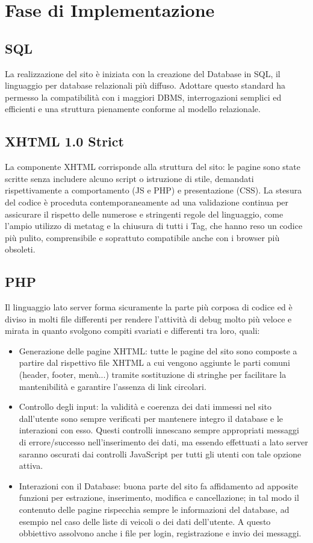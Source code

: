 \section{Fase di Implementazione}

\subsection{SQL}
La realizzazione del sito è iniziata con la creazione del Database in SQL, il linguaggio per database relazionali più diffuso. Adottare questo standard ha permesso la compatibilità con i maggiori DBMS, interrogazioni semplici ed efficienti e una struttura pienamente conforme al modello relazionale.

\subsection{XHTML 1.0 Strict}
La componente XHTML corrisponde alla struttura del sito: le pagine sono state scritte senza includere alcuno script o istruzione di stile, demandati rispettivamente a comportamento (JS e PHP) e presentazione (CSS). La stesura del codice è proceduta contemporaneamente ad una validazione continua
per assicurare il rispetto delle numerose e stringenti regole del linguaggio, come l'ampio utilizzo di metatag e la chiusura di tutti i Tag, che hanno reso un codice più pulito, comprensibile e soprattuto compatibile anche con i browser più obsoleti.

\subsection{PHP}
Il linguaggio lato server forma sicuramente la parte più corposa di codice ed è diviso in molti file differenti per rendere l’attività di debug molto più veloce e mirata in quanto svolgono compiti svariati e differenti tra loro, quali:
\begin{itemize}
 \item Generazione delle pagine XHTML: tutte le pagine del sito sono composte a partire dal rispettivo file XHTML a cui vengono aggiunte le parti comuni (header, footer, menù...) tramite sostituzione di stringhe per facilitare la mantenibilità e garantire l'assenza di link circolari.
 \item Controllo degli input: la validità e coerenza dei dati immessi nel sito dall'utente sono sempre verificati per mantenere integro il database e le interazioni con esso. Questi controlli innescano sempre appropriati messaggi di errore/successo nell'inserimento dei dati, ma essendo effettuati a lato server saranno oscurati dai controlli JavaScript per tutti gli utenti con tale opzione attiva.
 \item Interazioni con il Database: buona parte del sito fa affidamento ad apposite funzioni per estrazione, inserimento, modifica e cancellazione; in tal modo il contenuto delle pagine rispecchia sempre le informazioni del database, ad esempio nel caso delle liste di veicoli o dei dati dell'utente. A questo obbiettivo assolvono anche i file per login, registrazione e invio dei messaggi.
\end{itemize}

